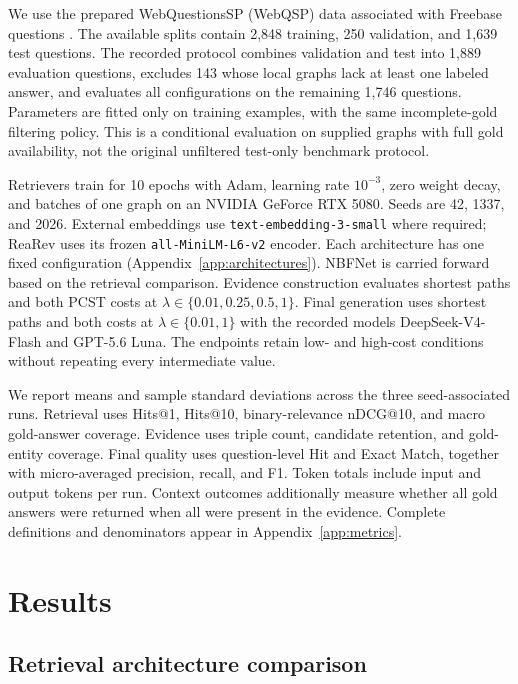 \documentclass[10pt]{article}
\begin{document}
We use the prepared WebQuestionsSP (WebQSP) data associated with Freebase questions \citep{yih2016webqsp}. The available splits contain 2,848 training, 250 validation, and 1,639 test questions. The recorded protocol combines validation and test into 1,889 evaluation questions, excludes 143 whose local graphs lack at least one labeled answer, and evaluates all configurations on the remaining 1,746 questions. Parameters are fitted only on training examples, with the same incomplete-gold filtering policy. This is a conditional evaluation on supplied graphs with full gold availability, not the original unfiltered test-only benchmark protocol.

Retrievers train for 10 epochs with Adam, learning rate $10^{-3}$, zero weight decay, and batches of one graph on an NVIDIA GeForce RTX 5080. Seeds are 42, 1337, and 2026. External embeddings use \texttt{text-embedding-3-small} where required; ReaRev uses its frozen \texttt{all-MiniLM-L6-v2} encoder. Each architecture has one fixed configuration (Appendix~\ref{app:architectures}). NBFNet is carried forward based on the retrieval comparison. Evidence construction evaluates shortest paths and both PCST costs at $\lambda\in\{0.01,0.25,0.5,1\}$. Final generation uses shortest paths and both costs at $\lambda\in\{0.01,1\}$ with the recorded models DeepSeek-V4-Flash and GPT-5.6 Luna. The endpoints retain low- and high-cost conditions without repeating every intermediate value.

We report means and sample standard deviations across the three seed-associated runs. Retrieval uses Hits@1, Hits@10, binary-relevance nDCG@10, and macro gold-answer coverage. Evidence uses triple count, candidate retention, and gold-entity coverage. Final quality uses question-level Hit and Exact Match, together with micro-averaged precision, recall, and F1. Token totals include input and output tokens per run. Context outcomes additionally measure whether all gold answers were returned when all were present in the evidence. Complete definitions and denominators appear in Appendix~\ref{app:metrics}.

\section{Results}
\label{sec:results}

\subsection{Retrieval architecture comparison}
\label{sec:retrieval-results}
\end{document}
